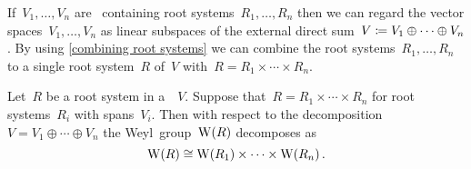 % 
%   
%   
%   


\begin{example}
  If~$V_1, \dotsc, V_n$ are~{\vectorspaces{$\kf$}} containing root systems~$R_1, \dotsc, R_n$ then we can regard the vector spaces~$V_1, \dotsc, V_n$ as linear subspaces of the external direct sum~$V \coloneqq V_1 \oplus \dotsb \oplus V_n$.
  By using \cref{combining root systems} we can combine the root systems~$R_1, \dotsc, R_n$ to a single root system~$R$ of~$V$ with~$R = R_1 \times \dotsb \times R_n$.
\end{example}





\begin{lemma}
  \label{decomposition of weyl group}
  Let~$R$ be a root system in a~{\vectorspace{$\kf$}}~$V$.
  Suppose that~$R = R_1 \times \dotsb \times R_n$ for root systems~$R_i$ with spans~$V_i$.
  Then with respect to the decomposition~$V = V_1 \oplus \dotsb \oplus V_n$ the Weyl~group~$\operatorname{W}(R)$ decomposes as
  \[
    \operatorname{W}(R)
    \cong
    \operatorname{W}(R_1) \times \dotsb \times \operatorname{W}(R_n) \,.
  \]
\end{lemma}



